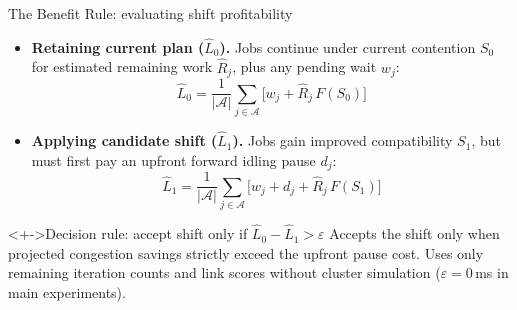 \documentclass[aspectratio=169,11pt,c]{beamer}
\begin{document}
\begin{frame}{The Benefit Rule: evaluating shift profitability}
  \footnotesize
  \setlength{\abovedisplayskip}{2pt}
  \setlength{\belowdisplayskip}{2pt}
  \begin{itemize}[<+->]
    \item \textbf{Retaining current plan ($\widehat{L}_0$).} Jobs continue under current contention $S_0$ for estimated remaining work $\widehat{R}_j$, plus any pending wait $w_j$:
    \[ \widehat{L}_0 = \frac{1}{|\mathcal{A}|}\sum_{j \in \mathcal{A}}\big[w_j + \widehat{R}_j\,F(S_0)\big] \]

    \item \textbf{Applying candidate shift ($\widehat{L}_1$).} Jobs gain improved compatibility $S_1$, but must first pay an upfront forward idling pause $d_j$:
    \[ \widehat{L}_1 = \frac{1}{|\mathcal{A}|}\sum_{j \in \mathcal{A}}\big[w_j + d_j + \widehat{R}_j\,F(S_1)\big] \]
  \end{itemize}
  \vspace{-0.4em}
  \begin{block}<+->{Decision rule: accept shift only if $\widehat{L}_0 - \widehat{L}_1 > \varepsilon$}
    \scriptsize Accepts the shift only when projected congestion savings strictly exceed the upfront pause cost. Uses only remaining iteration counts and link scores without cluster simulation ($\varepsilon=0$\,ms in main experiments).
  \end{block}
\end{frame}
\end{document}
